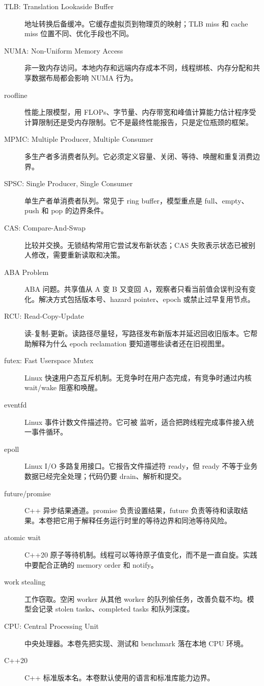 \begin{description}
  \item[TLB: Translation Lookaside Buffer] 地址转换后备缓冲。它缓存虚拟页到物理页的映射；TLB miss 和 cache miss 位置不同、优化手段也不同。
  \item[NUMA: Non-Uniform Memory Access] 非一致内存访问。本地内存和远端内存成本不同，线程绑核、内存分配和共享数据布局都会影响 NUMA 行为。
  \item[roofline] 性能上限模型，用 FLOPs、字节量、内存带宽和峰值计算能力估计程序受计算限制还是受内存限制。它不是最终性能报告，只是定位瓶颈的框架。
  \item[MPMC: Multiple Producer, Multiple Consumer] 多生产者多消费者队列。它必须定义容量、关闭、等待、唤醒和重复消费边界。
  \item[SPSC: Single Producer, Single Consumer] 单生产者单消费者队列。常见于 ring buffer，模型重点是 full、empty、push 和 pop 的边界条件。
  \item[CAS: Compare-And-Swap] 比较并交换。无锁结构常用它尝试发布新状态；CAS 失败表示状态已被别人修改，需要重新读取和决策。
  \item[ABA Problem] ABA 问题。共享值从 A 变 B 又变回 A，观察者只看当前值会误判没有变化。解决方式包括版本号、hazard pointer、epoch 或禁止过早复用节点。
  \item[RCU: Read-Copy-Update] 读-复制-更新。读路径尽量轻，写路径发布新版本并延迟回收旧版本。它帮助解释为什么 epoch reclamation 要知道哪些读者还在旧视图里。
  \item[futex: Fast Userspace Mutex] Linux 快速用户态互斥机制。无竞争时在用户态完成，有竞争时通过内核 wait/wake 阻塞和唤醒。
  \item[eventfd] Linux 事件计数文件描述符。它可被  监听，适合把跨线程完成事件接入统一事件循环。
  \item[epoll] Linux I/O 多路复用接口。它报告文件描述符 ready，但 ready 不等于业务数据已经完全处理；代码仍要 drain、解析和提交。
  \item[future/promise] C++ 异步结果通道。promise 负责设置结果，future 负责等待和读取结果。本卷把它用于解释任务运行时里的等待边界和同池等待风险。
  \item[atomic wait] C++20 原子等待机制。线程可以等待原子值变化，而不是一直自旋。实践中要配合正确的 memory order 和 notify。
  \item[work stealing] 工作窃取。空闲 worker 从其他 worker 的队列偷任务，改善负载不均。模型会记录 stolen tasks、completed tasks 和队列深度。
  \item[CPU: Central Processing Unit] 中央处理器。本卷先把实现、测试和 benchmark 落在本地 CPU 环境。
  \item[C++20] C++ 标准版本名。本卷默认使用的语言和标准库能力边界。

\end{description}
